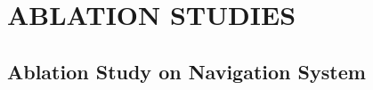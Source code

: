 \chapter{ABLATION STUDIES}
\label{sec:chap4_result5}
\section*{ }

\section{Ablation Study on Navigation System}
\AblationStudyonNavigationSystem

